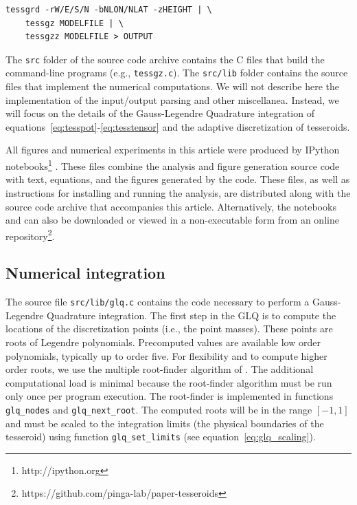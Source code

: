 \documentclass[paper,twocolumn]{geophysics}
\begin{document}
\begin{verbatim}
tessgrd -rW/E/S/N -bNLON/NLAT -zHEIGHT | \
    tessgz MODELFILE | \
    tessgzz MODELFILE > OUTPUT
\end{verbatim}

The \texttt{src} folder of the source code archive
contains the C files that build the command-line programs
(e.g., \texttt{tessgz.c}).
The \texttt{src/lib} folder contains
the source files that implement the numerical computations.
We will not describe here the implementation of the input/output parsing and
other miscellanea.
Instead, we will focus on the details of the Gauss-Legendre Quadrature
integration of equations~\ref{eq:tesspot}-\ref{eq:tesstensor}
and the adaptive discretization of tesseroids.


All figures and numerical experiments in this article
were produced by IPython notebooks\footnote{http://ipython.org}
\citep{Perez2007}.
These files combine the analysis and figure generation source code
with text, equations, and the figures generated by the code.
These files,
as well as instructions for installing and running the analysis,
are distributed along with the source code archive
that accompanies this article.
Alternatively,
the notebooks and can also be downloaded
or viewed in a non-executable form from
an online repository\footnote{https://github.com/pinga-lab/paper-tesseroids}.


\subsection{Numerical integration}

The source file \texttt{src/lib/glq.c}
contains the code necessary to perform
a Gauss-Legendre Quadrature integration.
The first step in the GLQ is to compute the
locations of the discretization points (i.e., the point masses).
These points are roots of Legendre polynomials.
Precomputed values are available low order polynomials,
typically up to order five.
For flexibility and to compute higher order roots,
we use the multiple root-finder algorithm of
\citet{Barrera-Figueroa2006}.
The additional computational load is minimal
because the root-finder algorithm
must be run only once per program execution.
The root-finder is implemented in functions
\texttt{glq\_nodes} and \texttt{glq\_next\_root}.
The computed roots will be in the range $[-1, 1]$
and must be scaled to the integration limits
(the physical boundaries of the tesseroid)
using function \texttt{glq\_set\_limits} (see equation~\ref{eq:glq_scaling}).
\end{document}
